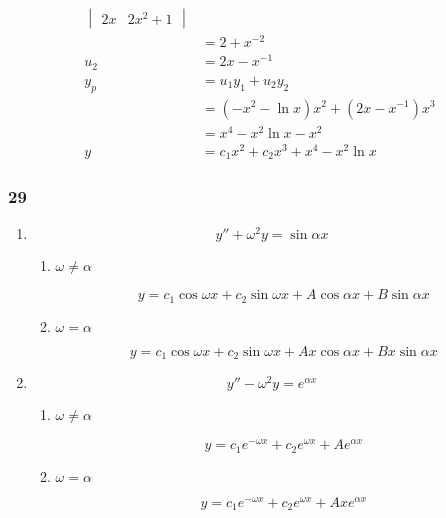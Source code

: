 \documentclass{article}
\begin{document}
\begin{align*}
\begin{vmatrix}
                                              2 x & 2 x^2 + 1
                                            \end{vmatrix}                 \\
                                 & = 2 + x^{-2}                             \\
  u_2                            & = 2 x - x^{-1}                           \\
  y_p                            & = u_1 y_1 + u_2 y_2                      \\
                                 & = (-x^2 - \ln x) x^2 + (2 x- x^{-1}) x^3 \\
                                 & = x^4 - x^2 \ln x - x^2                  \\
  y                              & = c_1 x^2 + c_2 x^3 + x^4 - x^2 \ln x
\end{align*}

\subsubsection{29}

\begin{enumerate}
  \item

        \[y'' + \omega^2 y = \sin \alpha x\]

        \begin{enumerate}
          \item

                $\omega \ne \alpha$

                \[y = c_1 \cos \omega x + c_2 \sin \omega x + A \cos \alpha x + B \sin \alpha x\]

          \item

                $\omega = \alpha$

                \[y = c_1 \cos \omega x + c_2 \sin \omega x + A x \cos \alpha x + B x \sin \alpha x\]
        \end{enumerate}

  \item

        \[y'' - \omega^2 y = e^{\alpha x}\]

        \begin{enumerate}
          \item

                $\omega \ne \alpha$

                \[y = c_1 e^{-\omega x} + c_2 e^{\omega x} + A e^{\alpha x}\]

          \item

                $\omega = \alpha$

                \[y = c_1 e^{-\omega x} + c_2 e^{\omega x} + A x e^{\alpha x}\]
        \end{enumerate}
\end{enumerate}
\end{document}
